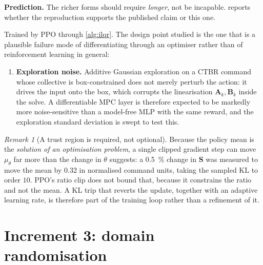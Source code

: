 \documentclass[11pt,a4paper,twoside,openright]{report}
\makeatletter
\renewcommand{\subsection}{\FloatBarrier\old@subsection}}
\newcommand{\mat}[1]{\bm{#1}}
\theoremstyle{plain}
\theoremstyle{definition}
\theoremstyle{remark}
\newtheorem{remark}[theorem]{Remark}
\makeatother
\begin{document}
	\textbf{Prediction.} The richer forms should require \emph{longer}, not be
	incapable.  reports whether the reproduction supports the
	published claim or this one.

	\subsection{Training}

	Trained by PPO through \cref{alg:ilqr}. The design point studied is the one
	that is a plausible failure mode of differentiating through an optimiser
	rather than of reinforcement learning in general:

	\begin{enumerate}[leftmargin=*]
		\item \textbf{Exploration noise.} Additive Gaussian exploration on a CTBR command
		whose collective is box-constrained does not merely perturb the action: it
		drives the input onto the box, which corrupts the linearisation
		$\mat A_k,\mat B_k$ inside the solve. A differentiable MPC layer is therefore
		expected to be markedly more noise-sensitive than a model-free MLP with the
		same reward, and the exploration standard deviation is swept to test this.
	\end{enumerate}

	\begin{remark}[A trust region is required, not optional]
		Because the policy mean is the \emph{solution of an optimisation problem}, a
		single clipped gradient step can move $\mu_\theta$ far more than the change in
		$\theta$ suggests: a \SI{0.5}{\percent} change in $\mat S$ was measured to move
		the mean by \num{0.32} in normalised command units, taking the sampled KL to
		order $10$. PPO's ratio clip does not bound that, because it constrains the
		ratio and not the mean. A KL trip that reverts the update, together with an
		adaptive learning rate, is therefore part of the training loop rather than a
		refinement of it.
	\end{remark}

	\section{Increment 3: domain randomisation}
	\label{sec:dr}\label{sec:noise}
\end{document}
